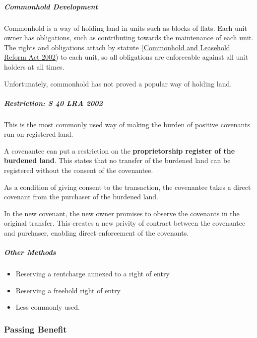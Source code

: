 \documentclass[
]{article}
\newenvironment{Shaded}{}{}
\newcommand{\NormalTok}[1]{#1}
\providecommand{\tightlist}{%
  \setlength{\itemsep}{0pt}\setlength{\parskip}{0pt}}
\begin{document}
\hypertarget{commonhold-development}{%
\subparagraph{Commonhold Development}\label{commonhold-development}}

Commonhold is a way of holding land in units such as blocks of flats.
Each unit owner has obligations, such as contributing towards the
maintenance of each unit. The rights and obligations attach by statute
(\href{https://www.legislation.gov.uk/ukpga/2002/15/contents}{Commonhold
and Leasehold Reform Act 2002}) to each unit, so all obligations are
enforceable against all unit holders at all times.

Unfortunately, commonhold has not proved a popular way of holding land.

\hypertarget{restriction-s-40-lra-2002}{%
\subparagraph{Restriction: S 40 LRA
2002}\label{restriction-s-40-lra-2002}}

\begin{Shaded}
\begin{Highlighting}[]
\NormalTok{This is the most commonly used way of making the burden of positive covenants run on registered land.}
\end{Highlighting}
\end{Shaded}

A covenantee can put a restriction on the \textbf{proprietorship
register of the burdened land}. This states that no transfer of the
burdened land can be registered without the consent of the covenantee.

As a condition of giving consent to the transaction, the covenantee
takes a direct covenant from the purchaser of the burdened land.

In the new covenant, the new owner promises to observe the covenants in
the original transfer. This creates a new privity of contract between
the covenantee and purchaser, enabling direct enforcement of the
covenants.

\hypertarget{other-methods-1}{%
\subparagraph{Other Methods}\label{other-methods-1}}

\begin{itemize}
\tightlist
\item
  Reserving a rentcharge annexed to a right of entry
\item
  Reserving a freehold right of entry
\item
  Less commonly used.
\end{itemize}

\hypertarget{passing-benefit}{%
\subsubsection{Passing Benefit}\label{passing-benefit}}
\end{document}
